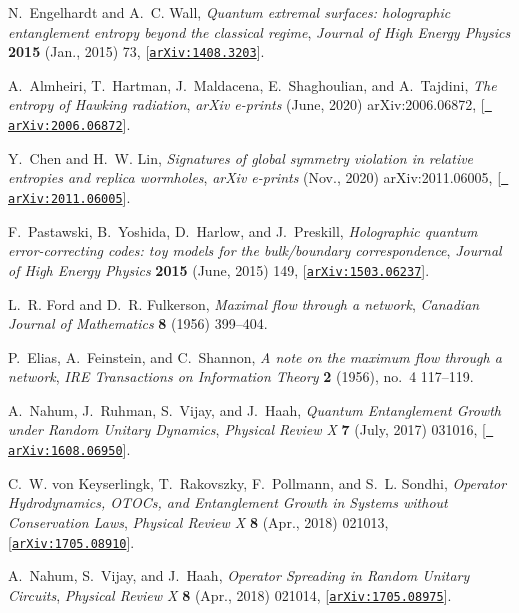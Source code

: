 \documentclass[a4paper,11pt]{article}
\begin{document}
\begin{thebibliography}{100}
N.~{Engelhardt} and A.~C. {Wall}, {\it {Quantum extremal surfaces: holographic
  entanglement entropy beyond the classical regime}},  {\em Journal of High
  Energy Physics} {\bf 2015} (Jan., 2015) 73,
  [\href{http://arxiv.org/abs/1408.3203}{{\tt arXiv:1408.3203}}].

A.~{Almheiri}, T.~{Hartman}, J.~{Maldacena}, E.~{Shaghoulian}, and
  A.~{Tajdini}, {\it {The entropy of Hawking radiation}},  {\em arXiv e-prints}
  (June, 2020) arXiv:2006.06872, [\href{http://arxiv.org/abs/2006.06872}{{\tt
  arXiv:2006.06872}}].

Y.~{Chen} and H.~W. {Lin}, {\it {Signatures of global symmetry violation in
  relative entropies and replica wormholes}},  {\em arXiv e-prints} (Nov.,
  2020) arXiv:2011.06005, [\href{http://arxiv.org/abs/2011.06005}{{\tt
  arXiv:2011.06005}}].

F.~{Pastawski}, B.~{Yoshida}, D.~{Harlow}, and J.~{Preskill}, {\it {Holographic
  quantum error-correcting codes: toy models for the bulk/boundary
  correspondence}},  {\em Journal of High Energy Physics} {\bf 2015} (June,
  2015) 149, [\href{http://arxiv.org/abs/1503.06237}{{\tt arXiv:1503.06237}}].

L.~R. Ford and D.~R. Fulkerson, {\it Maximal flow through a network},  {\em
  Canadian Journal of Mathematics} {\bf 8} (1956) 399–404.

P.~Elias, A.~Feinstein, and C.~Shannon, {\it A note on the maximum flow through
  a network},  {\em IRE Transactions on Information Theory} {\bf 2} (1956),
  no.~4 117--119.

A.~{Nahum}, J.~{Ruhman}, S.~{Vijay}, and J.~{Haah}, {\it {Quantum Entanglement
  Growth under Random Unitary Dynamics}},  {\em Physical Review X} {\bf 7}
  (July, 2017) 031016, [\href{http://arxiv.org/abs/1608.06950}{{\tt
  arXiv:1608.06950}}].

C.~W. {von Keyserlingk}, T.~{Rakovszky}, F.~{Pollmann}, and S.~L. {Sondhi},
  {\it {Operator Hydrodynamics, OTOCs, and Entanglement Growth in Systems
  without Conservation Laws}},  {\em Physical Review X} {\bf 8} (Apr., 2018)
  021013, [\href{http://arxiv.org/abs/1705.08910}{{\tt arXiv:1705.08910}}].

A.~{Nahum}, S.~{Vijay}, and J.~{Haah}, {\it {Operator Spreading in Random
  Unitary Circuits}},  {\em Physical Review X} {\bf 8} (Apr., 2018) 021014,
  [\href{http://arxiv.org/abs/1705.08975}{{\tt arXiv:1705.08975}}].


\end{thebibliography}
\end{document}
